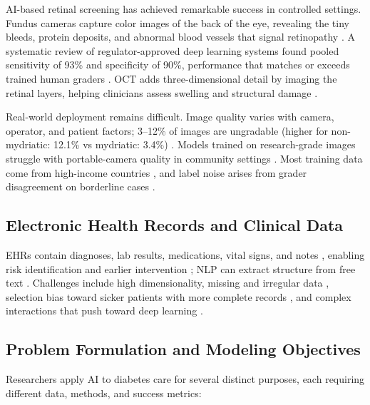 AI-based retinal screening has achieved remarkable success in controlled settings. Fundus cameras capture color images of the back of the eye, revealing the tiny bleeds, protein deposits, and abnormal blood vessels that signal retinopathy \cite{selvachandran2022developments, abushawish2024deep}. A systematic review of regulator-approved deep learning systems found pooled sensitivity of 93\% and specificity of 90\%, performance that matches or exceeds trained human graders \cite{zhang2025systematic, liu2023prospective, wu2023efficacy}. OCT adds three-dimensional detail by imaging the retinal layers, helping clinicians assess swelling and structural damage \cite{contreras2018artificial, padhy2024systematic}.

Real-world deployment remains difficult. Image quality varies with camera, operator, and patient factors; 3--12\% of images are ungradable (higher for non-mydriatic: 12.1\% vs mydriatic: 3.4\%) \cite{zhang2025systematic, kanclerz2021imaging}. Models trained on research-grade images struggle with portable-camera quality in community settings \cite{raj2024federated, zhang2025systematic}. Most training data come from high-income countries \cite{wang2024ai, olusanya2024mitigating}, and label noise arises from grader disagreement on borderline cases \cite{zhang2025systematic}.

\subsection{Electronic Health Records and Clinical Data}

EHRs contain diagnoses, lab results, medications, vital signs, and notes \cite{contreras2018artificial, oikonomou2023machine}, enabling risk identification and earlier intervention \cite{wang2024ai}; NLP can extract structure from free text \cite{contreras2018artificial}. Challenges include high dimensionality, missing and irregular data \cite{oikonomou2023machine}, selection bias toward sicker patients with more complete records \cite{jacobs2023artificial}, and complex interactions that push toward deep learning \cite{zhu2021deep}.

\subsection{Problem Formulation and Modeling Objectives}

Researchers apply AI to diabetes care for several distinct purposes, each requiring different data, methods, and success metrics:

